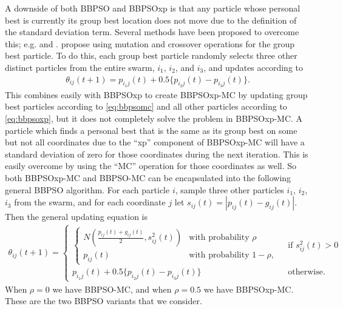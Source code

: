 \documentclass[cmbright]{staauth}
\begin{document}
A downside of both BBPSO and BBPSOxp is that any particle whose personal best is currently its group best location does not move due to the definition of the standard deviation term. Several methods have been proposed to overcome this; e.g. \citet{hsieh2010modified} and \citet{zhang2011novel}. \citet{zhang2011novel} propose using mutation and crossover operations for the group best particle. To do this, each group best particle randomly selects three other distinct particles from the entire swarm, $i_1$, $i_2$, and $i_3$, and updates according to
\begin{align}\label{eq:bbpsomc}
\theta_{ij}(t+1) = p_{i_1j}(t) + 0.5\{p_{i_2j}(t) - p_{i_3j}(t)\}.
\end{align}
This combines easily with BBPSOxp to create BBPSOxp-MC by updating group best particles according to \eqref{eq:bbpsomc} and all other particles according to \eqref{eq:bbpsoxp}, but it does not completely solve the problem in BBPSOxp-MC. A particle which finds a personal best that is the same as its group best on some but not all coordinates due to the ``xp'' component of BBPSOxp-MC will have a standard deviation of zero for those coordinates during the next iteration. This is easily overcome by using the ``MC'' operation for those coordinates as well. So both BBPSOxp-MC and BBPSO-MC can be encapsulated into the following general BBPSO algorithm. For each particle $i$, sample three other particles $i_1$, $i_2$, $i_3$ from the swarm, and for each coordinate $j$ let $s_{ij}(t) = |p_{ij}(t) - g_{ij}(t)|$. Then the general updating equation is
\begin{align}\label{eq:bbpsoall}
\theta_{ij}(t+1) =
  \begin{cases}
    \begin{cases} N\left(\frac{p_{ij}(t) + g_{ij}(t)}{2}, s^2_{ij}(t)\right) & \mbox{with probability } \rho\\
      p_{ij}(t) & \mbox{with probability } 1 - \rho,
    \end{cases}
    & \mbox{ if } s^2_{ij}(t) > 0\\
    p_{i_1j}(t) + 0.5\{p_{i_2j}(t) - p_{i_3j}(t)\} & \mbox{ otherwise.}
  \end{cases}
\end{align}
When $\rho = 0$ we have BBPSO-MC, and when $\rho = 0.5$ we have BBPSOxp-MC. These are the two BBPSO variants that we consider.
\end{document}
